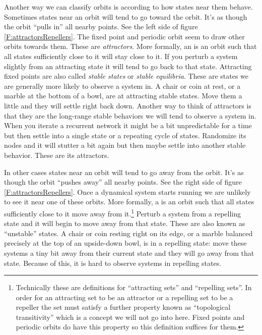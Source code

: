    Another way we can classify orbits is according to how states near  them behave. Sometimes states near an orbit will tend to  go toward the orbit. It's as though the orbit ``pulls in'' all nearby points. See the left side of figure \ref{F:attractorsRepellers}. The fixed point and periodic orbit seem to draw other orbits towards them. These are \emph{attractors}. More formally, an  is an orbit such that all states sufficiently close to it will stay close to it. If you perturb a system slightly from an attracting state it will tend to go back to that state. Attracting fixed points are also called \emph{stable states} or \emph{stable equilibria}. These are states we are generally more likely to observe a system in. A chair or coin at rest, or a marble at the bottom of a bowl, are at attracting stable states. Move them a little and they will settle right back down. Another way to think of attractors is that they are the long-range stable behaviors we will tend to observe a system in. When you iterate a recurrent network it might be a bit unpredictable for a time but then settle into a single state or a repeating cycle of states. Randomize its nodes and it will stutter a bit again but then maybe settle into another stable behavior. These are its attractors.

 In other cases states near an orbit will tend to go away from the orbit.
It's as though the orbit ``pushes away'' all nearby points. See the right side of figure \ref{F:attractorsRepellers}. Once a dynamical system starts running we are unlikely to see it near one of these
orbits. More formally, a  is an orbit such that all states sufficiently close
to it move away from it.\footnote{Technically these are definitions for
``attracting sets'' and ``repelling sets''. In order for an attracting set to
be an attractor or a repelling set to be a repeller the set must satisfy a
further property known as ``topological transitivity'' which is a concept we
will not go into here. Fixed points and periodic orbits do have this property
so this definition suffices for them.}  Perturb a system from a repelling state and it will begin to move away from that state. These are also known as ``unstable'' states. A chair or coin resting right on its edge, or a marble balanced precisely at the top of an upside-down bowl, is in a repelling state: move these systems a tiny bit away from their current state and they will go away from that state. Because of this, it is hard to observe systems in repelling states.

